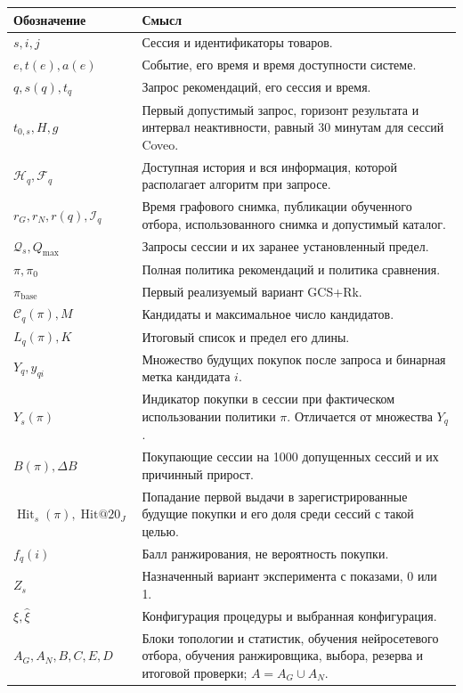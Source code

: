 \documentclass[12pt,a4paper]{article}
\theoremstyle{plainru}
\begin{document}
\small
\begin{longtable}{L{0.23\textwidth}L{0.69\textwidth}}
\toprule Обозначение & Смысл \\\midrule\endhead
\(s,i,j\) & Сессия и идентификаторы товаров. \\
\(e,t(e),a(e)\) & Событие, его время и время доступности системе. \\
\(q,s(q),t_q\) & Запрос рекомендаций, его сессия и время. \\
\(t_{0,s},H,g\) & Первый допустимый запрос, горизонт результата и интервал
неактивности, равный 30 минутам для сессий Coveo. \\
\(\mathcal H_q,\mathcal F_q\) & Доступная история и вся информация,
которой располагает алгоритм при запросе. \\
\(r_G,r_N,r(q),\mathcal I_q\) & Время графового снимка, публикации
обученного отбора, использованного снимка и допустимый каталог. \\
\(\mathcal Q_s,Q_{\max}\) & Запросы сессии и их заранее установленный предел. \\
\(\pi,\pi_0\) & Полная политика рекомендаций и политика сравнения. \\
\(\pi_{\mathrm{base}}\) & Первый реализуемый вариант GCS+Rk. \\
\(\mathcal C_q(\pi),M\) & Кандидаты и максимальное число кандидатов. \\
\(L_q(\pi),K\) & Итоговый список и предел его длины. \\
\(Y_q,y_{qi}\) & Множество будущих покупок после запроса и бинарная метка
кандидата \(i\). \\
\(Y_s(\pi)\) & Индикатор покупки в сессии при фактическом использовании
политики \(\pi\). Отличается от множества \(Y_q\). \\
\(B(\pi),\Delta B\) & Покупающие сессии на 1000 допущенных сессий и их причинный прирост. \\
\(\operatorname{Hit}_s(\pi),\operatorname{Hit@20}_J\) & Попадание первой выдачи
в зарегистрированные будущие покупки и его доля среди сессий с такой целью. \\
\(f_q(i)\) & Балл ранжирования, не вероятность покупки. \\
\(Z_s\) & Назначенный вариант эксперимента с показами, 0 или 1. \\
\(\xi,\widehat\xi\) & Конфигурация процедуры и выбранная конфигурация. \\
\(A_G,A_N,B,C,E,D\) & Блоки топологии и статистик, обучения нейросетевого
отбора, обучения ранжировщика, выбора, резерва и итоговой проверки;
\(A=A_G\cup A_N\). \\
\bottomrule
\end{longtable}
\normalsize
\end{document}
